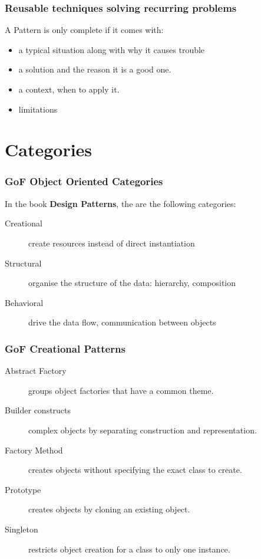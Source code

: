 \documentclass{beamer}
\begin{document}
\begin{frame}
\frametitle {Reusable techniques solving recurring problems}
A Pattern is only complete if it comes with:
\begin{itemize}
 \item a typical situation along with why it causes trouble
 \item a solution and the reason it is a good one.
 \item a context, when to apply it.
 \item limitations
\end{itemize}
\end{frame}

\section{Categories}

\begin{frame}
\frametitle {GoF Object Oriented Categories}
 In the book \textbf{Design Patterns}, the are the following categories:
\begin{description}
 \item [Creational] create resources instead of direct instantiation
 \item [Structural] organise the structure of the data: hierarchy, composition
 \item [Behavioral] drive the data flow, communication between objects
\end{description}
\end{frame}

\begin{frame}
\frametitle {GoF Creational Patterns}

\begin{description}
 \item [Abstract Factory] groups object factories that have a common theme.
 \item [Builder constructs] complex objects by separating construction and representation.
 \item [Factory Method] creates objects without specifying the exact class to create.
 \item [Prototype] creates objects by cloning an existing object.
 \item [Singleton] restricts object creation for a class to only one instance.
\end{description}
\end{frame}
\end{document}
